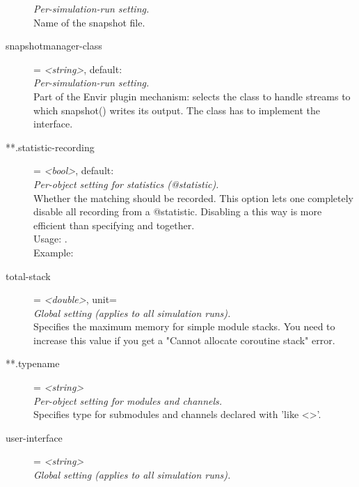 \begin{description}
    \textit{Per-simulation-run setting.}\\
    Name of the snapshot file.
\item[snapshotmanager-class] = \textit{<string>}, default: \\
    \textit{Per-simulation-run setting.}\\
    Part of the Envir plugin mechanism: selects the class to handle streams to
    which snapshot() writes its output. The class has to implement the
     interface.
\item[**.statistic-recording] = \textit{<bool>}, default: \\
    \textit{Per-object setting for statistics (@statistic).}\\
    Whether the matching  should be recorded. This
    option lets one completely disable all recording from a @statistic.
    Disabling a  this way is more efficient than
    specifying
     and
    together.\\
    Usage:
    .\\
    Example:
\item[total-stack] = \textit{<double>}, unit=\\
    \textit{Global setting (applies to all simulation runs).}\\
    Specifies the maximum memory for  simple module stacks. You
    need to increase this value if you get a "Cannot allocate coroutine stack"
    error.
\item[**.typename] = \textit{<string>}\\
    \textit{Per-object setting for modules and channels.}\\
    Specifies type for submodules and channels declared with 'like <>'.
\item[user-interface] = \textit{<string>}\\
    \textit{Global setting (applies to all simulation runs).}\\

\end{description}
